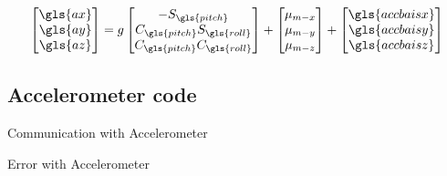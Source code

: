 \begin{equation}
		\begin{bmatrix}
		\gls{ax}\\ \gls{ay} \\\gls{az} 
		\end{bmatrix}
		= 
		g
		\begin{bmatrix}
		-S_{\gls{pitch}}\\ C_{\gls{pitch}}S_{\gls{roll}}\\C_{\gls{pitch}}C_{\gls{roll}} 
		\end{bmatrix}
		+
		\begin{bmatrix}
		\mu_{m-x}\\ \mu_{m-y}\\\mu_{m-z}
		\end{bmatrix}		
		+
		\begin{bmatrix}
		\gls{accbaisx}\\ \gls{accbaisy}\\\gls{accbaisz}
		\end{bmatrix}
\label{eq:acc simplified equation}
\end{equation}

 \tocless\subsection{Accelerometer code}

\begin{algorithm}
	\caption{Communication with Accelerometer}\label{Alg: acclermeter setup}
	\begin{algorithmic}[1]
	  									
	
	        \Return Error with Accelerometer
	        \EndIf
	        
	   											
	 												
	 														
	\EndProcedure
	\end{algorithmic}
\end{algorithm}

